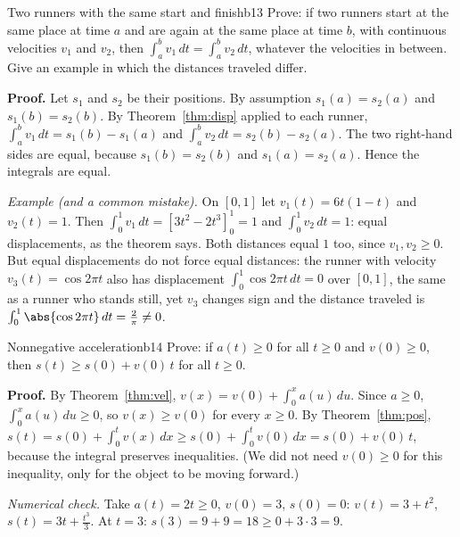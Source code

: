\documentclass[11pt]{article}
\begin{document}
\begin{exmp}{Two runners with the same start and finish}{b13}
Prove: if two runners start at the same place at time $a$ and are again at the same place at time $b$, with continuous velocities $v_1$ and $v_2$, then $\int_a^bv_1\,dt=\int_a^bv_2\,dt$, whatever the velocities in between. Give an example in which the distances traveled differ.

\textbf{Proof.} Let $s_1$ and $s_2$ be their positions. By assumption $s_1(a)=s_2(a)$ and $s_1(b)=s_2(b)$. By Theorem~\ref{thm:disp} applied to each runner, $\int_a^bv_1\,dt=s_1(b)-s_1(a)$ and $\int_a^bv_2\,dt=s_2(b)-s_2(a)$. The two right-hand sides are equal, because $s_1(b)=s_2(b)$ and $s_1(a)=s_2(a)$. Hence the integrals are equal.

\emph{Example (and a common mistake).} On $[0,1]$ let $v_1(t)=6t(1-t)$ and $v_2(t)=1$. Then $\int_0^1v_1\,dt=\left[3t^2-2t^3\right]_0^1=1$ and $\int_0^1v_2\,dt=1$: equal displacements, as the theorem says. Both distances equal $1$ too, since $v_1,v_2\ge0$. But equal displacements do not force equal distances: the runner with velocity $v_3(t)=\cos2\pi t$ also has displacement $\int_0^1\cos2\pi t\,dt=0$ over $[0,1]$, the same as a runner who stands still, yet $v_3$ changes sign and the distance traveled is $\int_0^1\abs{\cos2\pi t}\,dt=\frac2\pi\ne0$.
\end{exmp}

\begin{exmp}{Nonnegative acceleration}{b14}
Prove: if $a(t)\ge0$ for all $t\ge0$ and $v(0)\ge0$, then $s(t)\ge s(0)+v(0)\,t$ for all $t\ge0$.

\textbf{Proof.} By Theorem~\ref{thm:vel}, $v(x)=v(0)+\int_0^xa(u)\,du$. Since $a\ge0$, $\int_0^xa(u)\,du\ge0$, so $v(x)\ge v(0)$ for every $x\ge0$. By Theorem~\ref{thm:pos}, $s(t)=s(0)+\int_0^tv(x)\,dx\ge s(0)+\int_0^tv(0)\,dx=s(0)+v(0)\,t$, because the integral preserves inequalities. (We did not need $v(0)\ge0$ for this inequality, only for the object to be moving forward.)

\emph{Numerical check.} Take $a(t)=2t\ge0$, $v(0)=3$, $s(0)=0$: $v(t)=3+t^2$, $s(t)=3t+\frac{t^3}3$. At $t=3$: $s(3)=9+9=18\ge0+3\cdot3=9$. \checkmark
\end{exmp}
\end{document}
